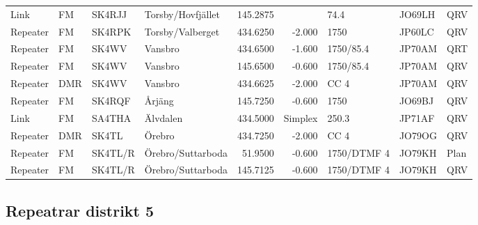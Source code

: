 {\begin{landscape}
\begin{longtable}{llllrrlll}
	Link                  & FM         & SK4RJJ   & Torsby/Hovfjället      &     145.2875 &            & 74.4              & JO69LH      & QRV      \\
	Repeater              & FM         & SK4RPK   & Torsby/Valberget       &     434.6250 &     -2.000 & 1750              & JP60LC      & QRV      \\
	Repeater              & FM         & SK4WV    & Vansbro                &     434.6500 &     -1.600 & 1750/85.4         & JP70AM      & QRT      \\
	Repeater              & FM         & SK4WV    & Vansbro                &     145.6500 &     -0.600 & 1750/85.4         & JP70AM      & QRV      \\
	Repeater              & DMR        & SK4WV    & Vansbro                &     434.6625 &     -2.000 & CC 4              & JP70AM      & QRV      \\
	Repeater              & FM         & SK4RQF   & Årjäng                 &     145.7250 &     -0.600 & 1750              & JO69BJ      & QRV      \\
	Link                  & FM         & SA4THA   & Älvdalen               &     434.5000 &    Simplex & 250.3             & JP71AF      & QRV      \\
	Repeater              & DMR        & SK4TL    & Örebro                 &     434.7250 &     -2.000 & CC 4              & JO79OG      & QRV      \\
	Repeater              & FM         & SK4TL/R  & Örebro/Suttarboda      &      51.9500 &     -0.600 & 1750/DTMF 4       & JO79KH      & Plan     \\
	Repeater              & FM         & SK4TL/R  & Örebro/Suttarboda      &     145.7125 &     -0.600 & 1750/DTMF 4       & JO79KH      & QRV
\end{longtable}



\clearpage

\subsection{Repeatrar distrikt 5}


\end{landscape}}
